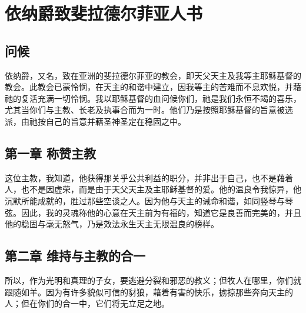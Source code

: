 
\chapter{依纳爵致斐拉德尔菲亚人书}



\section{问候}

依纳爵，又名，致在亚洲的斐拉德尔菲亚的教会，即天父天主及我等主耶稣基督的教会。此教会已蒙怜悯，在天主的和谐中建立，因我等主的苦难而不息欢悦，并藉祂的复活充满一切怜悯。我以耶稣基督的血问候你们，祂是我们永恒不竭的喜乐，尤其当你们与主教、长老及执事合而为一时。他们乃是按照耶稣基督的旨意被选派，由祂按自己的旨意并藉圣神圣定在稳固之中。\par


\section{第一章 称赞主教}

这位主教，我知道，他获得那关乎公共利益的职分，并非出于自己，也不是藉着人，也不是因虚荣，而是由于天父天主及主耶稣基督的爱。他的温良令我惊异，他沉默所能成就的，胜过那些空谈之人。因为他与天主的诫命和谐，如同竖琴与琴弦。因此，我的灵魂称他的心意在天主前为有福的，知道它是良善而完美的，并且他的稳固与毫无怒气，乃是效法永生天主无限温良的榜样。\par


\section{第二章 维持与主教的合一}

所以，作为光明和真理的子女，要逃避分裂和邪恶的教义；但牧人在哪里，你们就跟随如羊。因为有许多貌似可信的豺狼，藉着有害的快乐，掳掠那些奔向天主的人；但在你们的合一中，它们将无立足之地。\par


